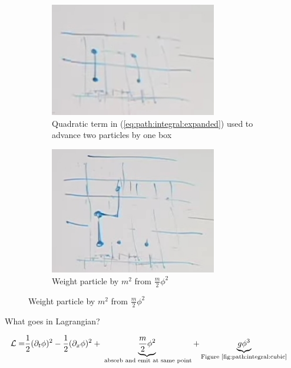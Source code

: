 \documentclass[]{article}
\begin{document}
\begin{figure}[H]
	\caption{Two particles}\label{fig:path:integral:2particles:1}
	\begin{subfigure}{0.45\textwidth}
		\caption{Quadratic term in (\ref{eq:path:integral:expanded}) used to advance two particles by one box}
		\includegraphics[width=0.8\textwidth]{path-integral-2particles-1}
	\end{subfigure}
	\begin{subfigure}{0.45\textwidth}
		\caption{Weight particle by $m^2$ from $\frac{m}{2}\phi^2$}\label{fig:path:integral:mass}
		\includegraphics[width=0.8\textwidth]{path-integral-mass}
	\end{subfigure}
\end{figure}

What goes in Lagrangian?

\begin{align*}
\mathcal{L}=& \frac{1}{2} (\partial_t \phi)^2 - \frac{1}{2} (\partial_x \phi)^2 + \underbrace{\frac{m}{2}\phi^2}_\text{ absorb and emit at same point} +\underbrace{g \phi^3}_\text{Figure \ref{fig:path:integral:cubic}}
\end{align*}
\end{document}
